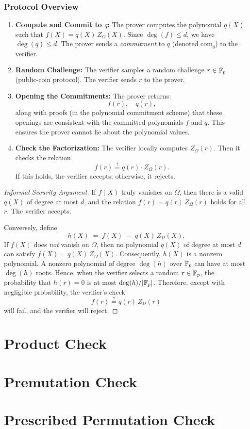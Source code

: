 \subsubsection*{Protocol Overview}
\begin{enumerate}
    \item \textbf{Compute and Commit to \(q\):} 
        The prover computes the polynomial \(q(X)\) such that \(f(X) = q(X)\,Z_{\Omega}(X)\). 
        Since \(\deg(f) \le d\), we have \(\deg(q) \le d\). 
        The prover sends a \emph{commitment} to \(q\) (denoted \(\text{com}_q\)) to the verifier.
    \item \textbf{Random Challenge:} 
        The verifier samples a random challenge \(r \in \mathbb{F}_p\) (public-coin protocol). 
        The verifier sends \(r\) to the prover.
    \item \textbf{Opening the Commitments:}
        The prover returns:
        \[
            f(r), \quad q(r),
        \]
        along with proofs (in the polynomial commitment scheme) that these openings are consistent with the committed polynomials \(f\) and \(q\). 
        This ensures the prover cannot lie about the polynomial values.
    \item \textbf{Check the Factorization:}
        The verifier locally computes \(Z_{\Omega}(r)\). 
        Then it checks the relation
        \[
            f(r) \stackrel{?}{=} q(r)\cdot Z_{\Omega}(r).
        \]
        If this holds, the verifier accepts; otherwise, it rejects.
\end{enumerate}

\begin{proof}[Informal Security Argument]
    If \(f(X)\) truly vanishes on \(\Omega\), then there is a valid \(q(X)\) of degree at most \(d\), and the relation \(f(r) = q(r)\,Z_{\Omega}(r)\) holds for all \(r\). The verifier accepts.
 
    Conversely, define
    \[
        h(X) \;=\; f(X)\;-\;q(X)\,Z_{\Omega}(X).
    \]
    If \(f(X)\) does \emph{not} vanish on \(\Omega\), then no polynomial \(q(X)\) of degree at most \(d\) can satisfy \(f(X) = q(X)\,Z_{\Omega}(X)\). 
    Consequently, \(h(X)\) is a nonzero polynomial. 
    A nonzero polynomial of degree \(\deg(h)\) over \(\mathbb{F}_p\) can have at most \(\deg(h)\) roots. 
    Hence, when the verifier selects a random \(r\in \mathbb{F}_p\), the probability that \(h(r) = 0\) is at most \(\deg(h)/|\mathbb{F}_p|\). 
    Therefore, except with negligible probability, the verifier's check 
    \[
        f(r) \stackrel{?}{=} q(r)\,Z_{\Omega}(r)
    \]
    will fail, and the verifier will reject.
\end{proof}

\section{Product Check}

\section{Premutation Check}

\section{Prescribed Permutation Check}